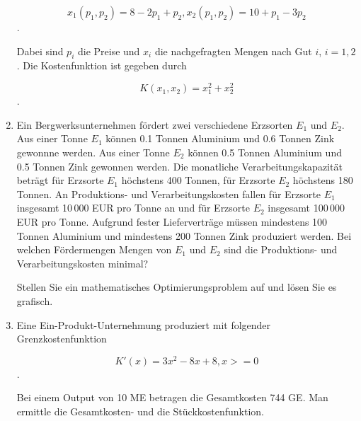 \documentclass[12pt,a4paper]{scrreprt}
\begin{document}
\begin{enumerate}
\[
x_1(p_1,p_2) = 8 - 2p_1 + p_2, x_2(p_1, p_2) = 10+p_1-3p_2
\].

Dabei sind $p_i$ die Preise und $x_i$ die nachgefragten Mengen nach Gut $i$, $i = 1, 2$. Die Kostenfunktion ist gegeben durch

\[
K(x_1, x_2) = x_1^2+x_2^2
\].

\item %
Ein Bergwerksunternehmen fördert zwei verschiedene Erzsorten $E_1$ und $E_2$. Aus einer Tonne $E_1$ können 0.1 Tonnen Aluminium und 0.6 Tonnen Zink gewonnne werden. Aus einer Tonne $E_2$ können 0.5 Tonnen Aluminium und 0.5 Tonnen Zink gewonnen werden. Die monatliche Verarbeitungskapazität beträgt für Erzsorte $E_1$ höchstens 400 Tonnen, für Erzsorte $E_2$ höchstens 180 Tonnen. An Produktions- und Verarbeitungskosten fallen für Erzsorte $E_1$ insgesamt 10\,000 EUR pro Tonne an und für Erzsorte $E_2$ insgesamt 100\,000 EUR pro Tonne. Aufgrund fester Lieferverträge müssen mindestens 100 Tonnen Aluminium und mindestens 200 Tonnen Zink produziert werden. Bei welchen Fördermengen Mengen von $E_1$ und $E_2$ sind die Produktions- und Verarbeitungskosten minimal?

Stellen Sie ein mathematisches Optimierungsproblem auf und lösen Sie es grafisch.

\item %
Eine Ein-Produkt-Unternehmung produziert mit folgender Grenzkostenfunktion

\[
K'(x) = 3x^2 -8x +8, x>=0
\].

Bei einem Output von 10 ME betragen die Gesamtkosten 744 GE. Man ermittle die Gesamtkosten- und die Stückkostenfunktion.

\end{enumerate}
\end{document}
